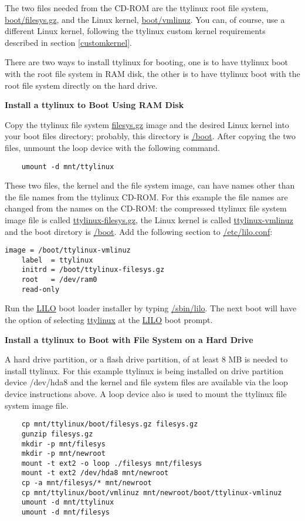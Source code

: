 \documentclass[10pt]{article}
\begin{document}
The two files needed from the CD-ROM are the ttylinux root file system,
\url{boot/filesys.gz}, and the Linux kernel, \url{boot/vmlinuz}. You
can, of course, use a different Linux kernel, following the ttylinux custom
kernel requirements described in section \ref{customkernel}.

There are two ways to install ttylinux for booting, one is to have ttylinux
boot with the root file system in RAM disk, the other is to have ttylinux boot
with the root file system directly on the hard drive.

{\bf Install a ttylinux to Boot Using RAM Disk}

Copy the ttylinux file system \url{filesys.gz} image and the desired Linux
kernel into your boot files directory; probably, this directory is \url{/boot}.
After copying the two files, unmount the loop device with the following command.

\begin{lstlisting}
	umount -d mnt/ttylinux
\end{lstlisting}

These two files, the kernel and the file system image, can have names other
than the file names from the ttylinux CD-ROM. For this example the file names
are changed from the names on the CD-ROM: the compressed ttylinux file system
image file is called \url{ttylinux-filesys.gz}, the Linux kernel is called
\url{ttylinux-vmlinuz} and the boot dirctory is \url{/boot}. Add the following
section to \url{/etc/lilo.conf}:

\begin{lstlisting}
image = /boot/ttylinux-vmlinuz
	label  = ttylinux
	initrd = /boot/ttylinux-filesys.gz
	root   = /dev/ram0
	read-only
\end{lstlisting}

Run the \url{LILO} boot loader installer by typing \url{/sbin/lilo}. The next
boot will have the option of selecting \url{ttylinux} at the \url{LILO} boot
prompt.

{\bf Install a ttylinux to Boot with File System on a Hard Drive}

A hard drive partition, or a flash drive partition, of at least 8 MB is needed
to install ttylinux. For this example ttylinux is being installed on drive
partition device /dev/hda8 and the kernel and file system files are available
via the loop device instructions above. A loop device also is used to mount the
ttylinux file system image file.

\begin{lstlisting}
	cp mnt/ttylinux/boot/filesys.gz filesys.gz
	gunzip filesys.gz
	mkdir -p mnt/filesys
	mkdir -p mnt/newroot
	mount -t ext2 -o loop ./filesys mnt/filesys
	mount -t ext2 /dev/hda8 mnt/newroot
	cp -a mnt/filesys/* mnt/newroot
	cp mnt/ttylinux/boot/vmlinuz mnt/newroot/boot/ttylinux-vmlinuz
	umount -d mnt/ttylinux
	umount -d mnt/filesys
\end{lstlisting}
\end{document}
